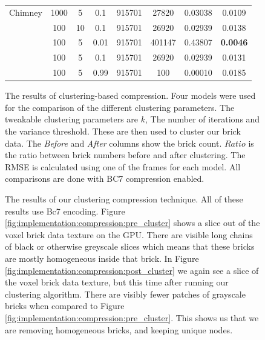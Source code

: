 \begin{figure}[H]
{\begin{tabular}{|l|ccc|cccc|}
            \hline
            \midrule
            Chimney      & 1000 & 5          & 0.1                & 915701  & 27820   & 0.03038           & 0.0109          \\
                         & 100  & 10         & 0.1                & 915701  & 26920   & 0.02939           & 0.0138          \\
                         & 100  & 5          & 0.01               & 915701  & 401147  & 0.43807           & \textbf{0.0046} \\
                         & 100  & 5          & 0.1                & 915701  & 26920   & 0.02939           & 0.0131          \\
                         & 100  & 5          & 0.99               & 915701  & 100     & 0.00010           & 0.0185          \\
            \hline
            \bottomrule
        \end{tabular}
        \label{tab:block_compression_visualized:table}
    }

    \caption{The results of clustering-based compression. Four models were used for the comparison of the different clustering parameters. The tweakable clustering parameters are $k$, The number of iterations and the variance threshold. These are then used to cluster our brick data. The \textit{Before} and \textit{After} columns show the brick count. $Ratio$ is the ratio between brick numbers before and after clustering. The RMSE is calculated using one of the frames for each model. All comparisons are done with BC7 compression enabled.} \label{fig:block_compression_visualized}
\end{figure}

\begin{figure}[H]
    \centering
    \hfill
    \caption{The results of our clustering compression technique. All of these results use Bc7 encoding. Figure \ref{fig:implementation:compression:pre_cluster} shows a slice out of the voxel brick data texture on the GPU. There are visible long chains of black or otherwise greyscale slices which means that these bricks are mostly homogeneous inside that brick. In Figure \ref{fig:implementation:compression:post_cluster} we again see a slice of the voxel brick data texture, but this time after running our clustering algorithm. There are visibly fewer patches of grayscale bricks when compared to Figure \ref{fig:implementation:compression:pre_cluster}. This shows us that we are removing homogeneous bricks, and keeping unique nodes.} \label{fig:implementation:compression:cluster}
\end{figure}



